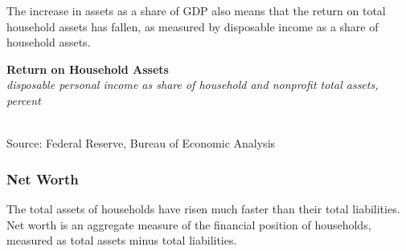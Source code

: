\documentclass{report}
\makeatletter
\newcommand{\tbllink}[1]{\href{https://raw.githubusercontent.com/bdecon/US-chartbook/master/chartbook/data/#1}{\faTable}}
\newcommand*\short[1]{\expandafter\@gobbletwo\number\numexpr#1\relax}
\newcommand{\dateaxisticks}{
		date coordinates in=x, axis line style={draw=none},
		xmax={2020-02-01},
		max space between ticks=40,	    
		xtick={{1990-01-01}, {1992-01-01}, {1994-01-01}, 
			{1996-01-01}, {1998-01-01}, {2000-01-01}, 
			{2002-01-01}, {2004-01-01}, {2006-01-01},
			{2008-01-01}, {2010-01-01}, {2012-01-01}, {2014-01-01},
		    {2016-01-01}, {2018-01-01}, {2020-01-01}},
		minor xtick={{1989-01-01}, {1991-01-01}, {1993-01-01},
			{1995-01-01}, {1997-01-01}, {1999-01-01}, 
			{2001-01-01}, {2003-01-01}, {2005-01-01}, {2007-01-01},
		    {2009-01-01}, {2011-01-01}, {2013-01-01}, {2015-01-01},
		    {2017-01-01}, {2019-01-01}},
		enlarge y limits={0.06}, enlarge x limits={0.01},
		}
\newcommand{\bbar}[2]{extra #1 ticks = {{#2}}, extra #1 tick labels = ,
		extra #1 tick style = {grid=major, grid style={thick, black!25}},}
\newcommand{\stdline}[4]{\addplot[very thick, no markers, color=#1] 
		table [x=#2, y=#3, col sep=comma] {#4};	}
\newcommand{\rbars}{
		\fill[color=black!10] (axis cs:{1990-07-01},\pgfkeysvalueof{/pgfplots/ymin}) rectangle 
			(axis cs:{1991-03-01}, \pgfkeysvalueof{/pgfplots/ymax});
		\fill[color=black!10] (axis cs:{2007-12-01},\pgfkeysvalueof{/pgfplots/ymin}) rectangle 
			(axis cs:{2009-07-01}, \pgfkeysvalueof{/pgfplots/ymax});
		\fill[color=black!10] (axis cs:{2001-03-01},\pgfkeysvalueof{/pgfplots/ymin}) rectangle 
			(axis cs:{2001-11-01}, \pgfkeysvalueof{/pgfplots/ymax});}
\makeatother
\begin{document}
{{{\begin{minipage}{0.76\textwidth}
\vspace{8mm}


\small The increase in assets as a share of GDP also means that the return on total household assets has fallen, as measured by disposable income as a share of household assets.  \\ 

\vspace{2mm}

\noindent \normalsize \textbf{Return on Household Assets}\\
\footnotesize{\textit{disposable personal income as share of household and nonprofit total assets, percent}}\\
\noindent \hspace*{-2mm} \\
\footnotesize{Source: Federal Reserve, Bureau of Economic Analysis} \hfill \tbllink{dpish.csv}


\end{minipage}

\newpage

\begin{minipage}{0.76\textwidth}

\subsubsection*{\color{black!70} \seriffont Net Worth}

\small The total assets of households have risen much faster than their total liabilities. Net worth is an aggregate measure of the financial position of households, measured as total assets minus total liabilities.  \\


\\

\vspace{3mm}


\end{minipage}}}}
\end{document}
